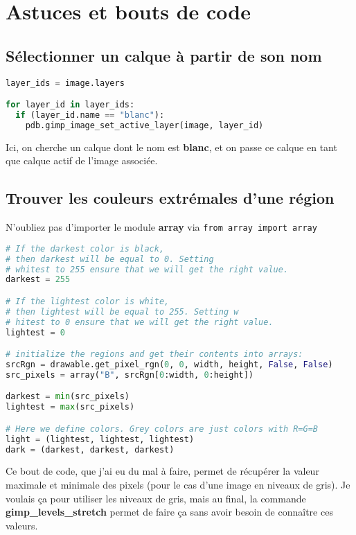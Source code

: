 \documentclass[a4paper,twoside]{article}
\begin{document}
\section{Astuces et bouts de code}
\subsection{Sélectionner un calque à partir de son nom}
\begin{lstlisting}[language=Python]
layer_ids = image.layers

for layer_id in layer_ids:
  if (layer_id.name == "blanc"):
    pdb.gimp_image_set_active_layer(image, layer_id)
\end{lstlisting}
Ici, on cherche un calque dont le nom est \textbf{blanc}, et on passe ce calque en tant que calque actif de l'image associée.

\subsection{Trouver les couleurs extrémales d'une région}
N'oubliez pas d'importer le module \textbf{array} via \texttt{from array import array}
\begin{lstlisting}[language=Python]
# If the darkest color is black, 
# then darkest will be equal to 0. Setting 
# whitest to 255 ensure that we will get the right value.
darkest = 255 

# If the lightest color is white, 
# then lightest will be equal to 255. Setting w
# hitest to 0 ensure that we will get the right value.
lightest = 0 

# initialize the regions and get their contents into arrays:
srcRgn = drawable.get_pixel_rgn(0, 0, width, height, False, False)
src_pixels = array("B", srcRgn[0:width, 0:height])

darkest = min(src_pixels)
lightest = max(src_pixels)

# Here we define colors. Grey colors are just colors with R=G=B
light = (lightest, lightest, lightest)
dark = (darkest, darkest, darkest)
\end{lstlisting}

Ce bout de code, que j'ai eu du mal à faire, permet de récupérer la valeur maximale et minimale des pixels (pour le cas d'une image en niveaux de gris). Je voulais ça pour utiliser les niveaux de gris, mais au final, la commande \textbf{gimp\_levels\_stretch} permet de faire ça sans avoir besoin de connaître ces valeurs.
\end{document}
